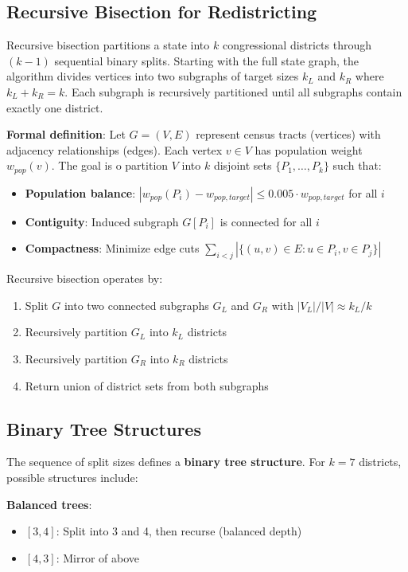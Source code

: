 \subsection{Recursive Bisection for Redistricting}

Recursive bisection partitions a state into $k$ congressional districts through $(k-1)$ sequential binary splits. Starting with the full state graph, the algorithm divides vertices into two subgraphs of target sizes $k_L$ and $k_R$ where $k_L + k_R = k$. Each subgraph is recursively partitioned until all subgraphs contain exactly one district.

\textbf{Formal definition}: Let $G = (V, E)$ represent census tracts (vertices) with adjacency relationships (edges). Each vertex $v \in V$ has population weight $w_{pop}(v)$. The goal is 	o partition $V$ into $k$ disjoint sets $\{P_1, \ldots, P_k\}$ such that:

\begin{itemize}
\item \textbf{Population balance}: $|w_{pop}(P_i) - w_{pop,target}| \leq 0.005 \cdot w_{pop,target}$ for all $i$
\item \textbf{Contiguity}: Induced subgraph $G[P_i]$ is connected for all $i$
\item \textbf{Compactness}: Minimize edge cuts $\sum_{i < j} |\{(u,v) \in E : u \in P_i, v \in P_j\}|$
\end{itemize}

Recursive bisection operates by:
\begin{enumerate}
\item Split $G$ into two connected subgraphs $G_L$ and $G_R$ with $|V_L| / |V| \approx k_L / k$
\item Recursively partition $G_L$ into $k_L$ districts
\item Recursively partition $G_R$ into $k_R$ districts
\item Return union of district sets from both subgraphs
\end{enumerate}

\subsection{Binary Tree Structures}

The sequence of split sizes defines a \textbf{binary tree structure}. For $k=7$ districts, possible structures include:

\textbf{Balanced trees}:
\begin{itemize}
\item $[3,4]$: Split into 3 and 4, then recurse (balanced depth)
\item $[4,3]$: Mirror of above
\end{itemize}

